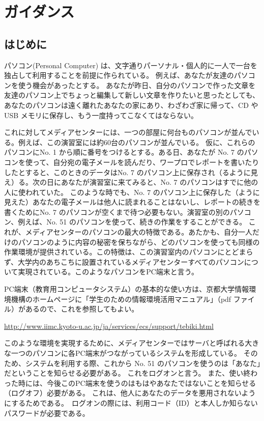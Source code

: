 \chapter{ガイダンス}

\section{はじめに}

パソコン(Personal Computer) は、文字通りパーソナル・個人的に一人で一台を独占して利用することを前提に作られている。
例えば、あなたが友達のパソコンを使う機会があったとする。
あなたが昨日、自分のパソコンで作った文章を友達のパソコン上でちょっと編集して新しい文章を作りたいと思ったとしても、
あなたのパソコンは遠く離れたあなたの家にあり、わざわざ家に帰って、CD や USB メモリに保存し、もう一度持ってこなくてはならない。

これに対してメディアセンターには、一つの部屋に何台ものパソコンが並んでいる。例えば、この演習室には約60台のパソコンが並んでいる。
仮に、これらのパソコンにNo. 1 から順に番号をつけるとする。ある日、あなたが No. 7 のパソコンを使って、自分宛の電子メールを読んだり、ワープロでレポートを書いたりしたとすると、このときのデータはNo. 7 のパソコン上に保存され（るように見え）る。次の日にあなたが演習室に来てみると、No. 7 のパソコンはすでに他の人に使われていた。
このような時でも、No. 7 のパソコン上に保存した（ように見えた）あなたの電子メールは他人に読まれることはないし、レポートの続きを書くためにNo. 7 のパソコンが空くまで待つ必要もない。演習室の別のパソコン、例えば、No. 51 のパソコンを使って、続きの作業をすることができる。
これが、メディアセンターのパソコンの最大の特徴である。あたかも、自分一人だけのパソコンのように内容の秘密を保ちながら、どのパソコンを使っても同様の作業環境が提供されている。この特徴は、この演習室内のパソコンにとどまらず、大学内のあちこちに設置されているメディアセンターすべてのパソコンについて実現されている。このようなパソコンをPC端末と言う。

PC端末（教育用コンピュータシステム）の基本的な使い方は、京都大学情報環境機構のホームページに「学生のための情報環境活用マニュアル」（pdf ファイル）があるので、これを参照してもよい。

\url{http://www.iimc.kyoto-u.ac.jp/ja/services/ecs/support/tebiki.html}

このような環境を実現するために、メディアセンターではサーバと呼ばれる大きな一つのパソコンに各PC端末がつながっているシステムを形成している。
そのため、システムを利用する際、これから No. 51 のパソコンを使うのは「あなた」だということを知らせる必要がある。
これをログオンと言う。
また、使い終わった時には、今後このPC端末を使うのはもはやあなたではないことを知らせる（ログオフ）必要がある。
これは、他人にあなたのデータを悪用されないようにするためである。　ログオンの際には、利用コード（ID）と本人しか知らないパスワードが必要である。

